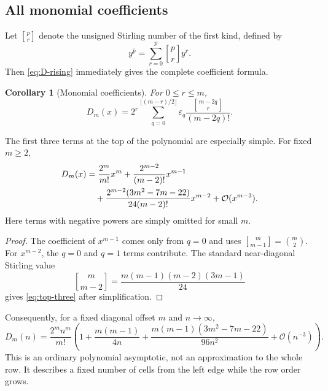 \documentclass[11pt,oneside]{article}
\newtheorem{corollary}[theorem]{Corollary}
\theoremstyle{definition}
\theoremstyle{remark}
\newcommand{\eps}{\varepsilon}
\newcommand{\Diag}{D}
\newcommand{\rising}[2]{#1^{\overline{#2}}}
\newcommand{\bigO}{\mathcal O}
\begin{document}
\subsection{All monomial coefficients}

Let $\genfrac{[}{]}{0pt}{}{p}{r}$ denote the unsigned Stirling number of the
first kind, defined by
\begin{equation}
 \rising y p=\sum_{r=0}^{p}\genfrac{[}{]}{0pt}{}{p}{r}y^r.
 \label{eq:stirling-first}
\end{equation}
Then \eqref{eq:D-rising} immediately gives the complete coefficient formula.

\begin{corollary}[Monomial coefficients]
\label{cor:monomial-coefficients}
For $0\le r\le m$,
\begin{equation}
 [x^r]\Diag_m(x)
 =2^r\sum_{q=0}^{\lfloor(m-r)/2\rfloor}
   \eps_q\frac{\genfrac{[}{]}{0pt}{}{m-2q}{r}}{(m-2q)!}.
 \label{eq:monomial-coefficients}
\end{equation}
\end{corollary}

The first three terms at the top of the polynomial are especially simple.
For fixed $m\ge2$,
\begin{align}
 \Diag_m(x)
 &=\frac{2^m}{m!}x^m
   +\frac{2^{m-2}}{(m-2)!}x^{m-1}
 \notag\\
 &\quad+
   \frac{2^{m-2}(3m^2-7m-22)}{24(m-2)!}x^{m-2}
   +\bigO(x^{m-3}).
 \label{eq:top-three}
\end{align}
Here terms with negative powers are simply omitted for small $m$.

\begin{proof}
The coefficient of $x^{m-1}$ comes only from $q=0$ and uses
$\genfrac{[}{]}{0pt}{}{m}{m-1}=\binom m2$.  For $x^{m-2}$, the $q=0$ and
$q=1$ terms contribute.  The standard near-diagonal Stirling value
\[
 \genfrac{[}{]}{0pt}{}{m}{m-2}
 =\frac{m(m-1)(m-2)(3m-1)}{24}
\]
gives \eqref{eq:top-three} after simplification.
\end{proof}

Consequently, for a fixed diagonal offset $m$ and $n\to\infty$,
\begin{equation}
 \Diag_m(n)=\frac{2^m n^m}{m!}
 \left(
  1+\frac{m(m-1)}{4n}
  +\frac{m(m-1)(3m^2-7m-22)}{96n^2}
  +\bigO(n^{-3})
 \right).
 \label{eq:D-large-n}
\end{equation}
This is an ordinary polynomial asymptotic, not an approximation to the whole
row.  It describes a fixed number of cells from the left edge while the row
order grows.
\end{document}

